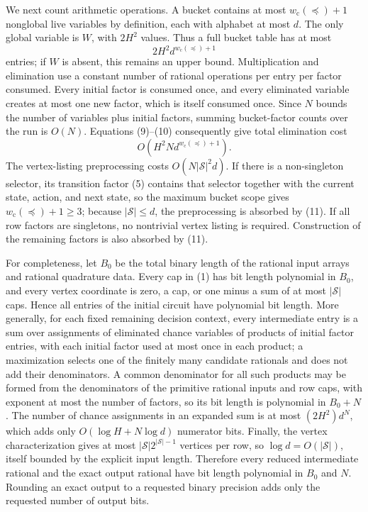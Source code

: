 We next count arithmetic operations.  A bucket contains at most \(w_{\mathrm c}(\preceq)+1\) nonglobal live variables by definition, each with alphabet at most \(d\).  The only global variable is \(W\), with \(2H^2\) values.  Thus a full bucket table has at most
\[
 2H^2d^{w_{\mathrm c}(\preceq)+1}
 \tag{10}
\]
entries; if \(W\) is absent, this remains an upper bound.  Multiplication and elimination use a constant number of rational operations per entry per factor consumed.  Every initial factor is consumed once, and every eliminated variable creates at most one new factor, which is itself consumed once.  Since \(N\) bounds the number of variables plus initial factors, summing bucket-factor counts over the run is \(O(N)\).  Equations (9)--(10) consequently give total elimination cost
\[
 O\!\left(H^2N d^{w_{\mathrm c}(\preceq)+1}\right).
 \tag{11}
\]
The vertex-listing preprocessing costs \(O(N|\mathcal S|^2d)\).  If there is a non-singleton selector, its transition factor (5) contains that selector together with the current state, action, and next state, so the maximum bucket scope gives \(w_{\mathrm c}(\preceq)+1\ge3\); because \(|\mathcal S|\le d\), the preprocessing is absorbed by (11).  If all row factors are singletons, no nontrivial vertex listing is required.  Construction of the remaining factors is also absorbed by (11).

For completeness, let \(B_0\) be the total binary length of the rational input arrays and rational quadrature data.  Every cap in (1) has bit length polynomial in \(B_0\), and every vertex coordinate is zero, a cap, or one minus a sum of at most \(|\mathcal S|\) caps.  Hence all entries of the initial circuit have polynomial bit length.  More generally, for each fixed remaining decision context, every intermediate entry is a sum over assignments of eliminated chance variables of products of initial factor entries, with each initial factor used at most once in each product; a maximization selects one of the finitely many candidate rationals and does not add their denominators.  A common denominator for all such products may be formed from the denominators of the primitive rational inputs and row caps, with exponent at most the number of factors, so its bit length is polynomial in \(B_0+N\).  The number of chance assignments in an expanded sum is at most \((2H^2)d^N\), which adds only \(O(\log H+N\log d)\) numerator bits.  Finally, the vertex characterization gives at most \(|\mathcal S|2^{|\mathcal S|-1}\) vertices per row, so \(\log d=O(|\mathcal S|)\), itself bounded by the explicit input length.  Therefore every reduced intermediate rational and the exact output rational have bit length polynomial in \(B_0\) and \(N\).  Rounding an exact output to a requested binary precision adds only the requested number of output bits.

